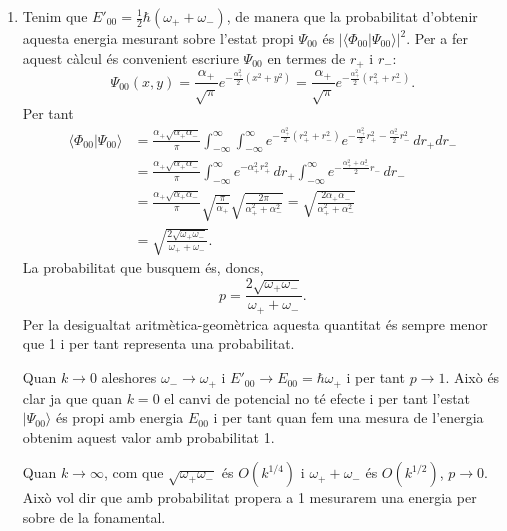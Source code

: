 \documentclass[12pt]{article}
\numberwithin{table}{section}
\numberwithin{figure}{section}
\numberwithin{equation}{section}
\newcommand{\abs}[1]{\lvert #1 \rvert}
\newcommand{\ket}[1]{\vert #1 \rangle}
\newcommand{\braket}[2]{\langle #1 \vert #2 \rangle}
\begin{document}
\begin{enumerate}[label=(\alph*), font=\bfseries \sffamily, wide, labelwidth=!, labelindent=0pt]
	\item Tenim que \( E'_{00} = \tfrac{1}{2}\hbar(\omega_+ + \omega_-) \), de manera que la probabilitat d'obtenir aquesta energia mesurant sobre l'estat propi \( \Psi_{00} \) és \( \abs{\braket{\Phi_{00}}{\Psi_{00}}}^2 \). Per a fer aquest càlcul és convenient escriure \( \Psi_{00} \) en termes de \( r_+ \) i \( r_- \):
		\begin{equation*}
			\Psi_{00}(x,y) = \frac{\alpha_+}{\sqrt{\pi}} e^{-\frac{\alpha_+^2}{2}(x^2 + y^2)} = \frac{\alpha_+}{\sqrt{\pi}} e^{-\frac{\alpha_+^2}{2}(r_+^2 + r_-^2)}. 
		\end{equation*}
		Per tant
		\begin{align*}
			\braket{\Phi_{00}}{\Psi_{00}} &= \frac{\alpha_+ \sqrt{\alpha_+ \alpha_-}}{\pi}\int_{-\infty}^\infty \int_{-\infty}^\infty e^{-\frac{\alpha_+^2}{2}(r_+^2 + r_-^2)} e^{-\frac{\alpha_+^2}{2}r_+^2 -\frac{\alpha_-^2}{2} r_-^2} \, dr_+ dr_-\\
																		&= \frac{\alpha_+ \sqrt{\alpha_+ \alpha_-}}{\pi} \int_{-\infty}^\infty e^{-\alpha_+^2r_+^2} \, dr_+ \int_{-\infty}^\infty e^{-\frac{\alpha_+^2 + \alpha_-^2}{2} r_-} \, dr_- \\
																		&= \frac{\alpha_+ \sqrt{\alpha_+ \alpha_-}}{\pi} \sqrt{\frac{\pi}{\alpha_+}} \sqrt{\frac{2\pi}{\alpha_+^2 + \alpha_-^2}} = \sqrt{\frac{2\alpha_+ \alpha_-}{\alpha_+^2 + \alpha_-^2}} \\
																		&= \sqrt{\frac{2\sqrt{\omega_+ \omega_-}}{\omega_+ + \omega_-}}. 
		\end{align*}
		La probabilitat que busquem és, doncs,
		\begin{equation*}
			p = \frac{2\sqrt{\omega_+ \omega_-} }{\omega_+ + \omega_-}.
		\end{equation*}
Per la desigualtat aritmètica-geomètrica aquesta quantitat és sempre menor que 1 i per tant representa una probabilitat. 

Quan \( k \to 0 \) aleshores \( \omega_- \to \omega_+ \) i \( E'_{00} \to E_{00} = \hbar \omega_+ \) i per tant \( p \to 1 \). Això és clar ja que quan \( k = 0 \) el canvi de potencial no té efecte i per tant l'estat \( \ket{\Psi_{00}} \) és propi amb energia \( E_{00} \) i per tant quan fem una mesura de l'energia obtenim aquest valor amb probabilitat 1. 

Quan \( k \to \infty \), com que \( \sqrt{\omega_+ \omega_-} \) és \( O(k^{1/4}) \) i \( \omega_+ + \omega_- \) és \( O(k^{1/2}) \), \( p \to 0 \). Això vol dir que amb probabilitat propera a 1 mesurarem una energia per sobre de la fonamental.
\end{enumerate}
\end{document}
